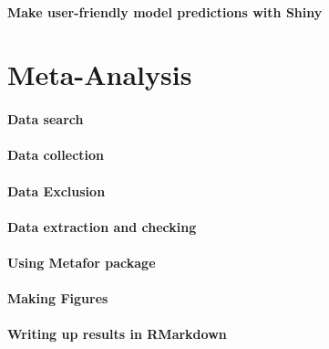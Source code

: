 \documentclass[]{book}
\theoremstyle{definition}
\theoremstyle{definition}
\theoremstyle{definition}
\theoremstyle{remark}
\begin{document}
\hypertarget{make-user-friendly-model-predictions-with-shiny}{%
\subsubsection{Make user-friendly model predictions with
Shiny}\label{make-user-friendly-model-predictions-with-shiny}}

\hypertarget{meta-analysis}{%
\chapter{Meta-Analysis}\label{meta-analysis}}

\hypertarget{data-search}{%
\subsubsection{Data search}\label{data-search}}

\hypertarget{data-collection-1}{%
\subsubsection{Data collection}\label{data-collection-1}}

\hypertarget{data-exclusion}{%
\subsubsection{Data Exclusion}\label{data-exclusion}}

\hypertarget{data-extraction-and-checking}{%
\subsubsection{Data extraction and
checking}\label{data-extraction-and-checking}}

\hypertarget{using-metafor-package}{%
\subsubsection{Using Metafor package}\label{using-metafor-package}}

\hypertarget{making-figures}{%
\subsubsection{Making Figures}\label{making-figures}}

\hypertarget{writing-up-results-in-rmarkdown}{%
\subsubsection{Writing up results in
RMarkdown}\label{writing-up-results-in-rmarkdown}}


\end{document}
